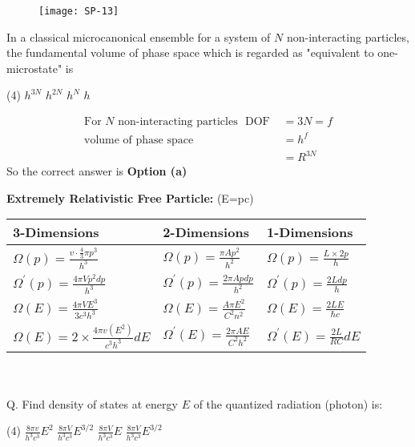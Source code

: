 \begin{figure}[H]
	\texttt{[image: SP-13]}
\end{figure}
\begin{exercise}
	In a classical microcanonical ensemble for a system of $N$ non-interacting particles, the fundamental volume of phase space which is regarded as "equivalent to one-microstate" is 
\end{exercise}
 \begin{tasks}(4)
	\task[\textbf{a.}] $h^{3 N}$
	\task[\textbf{b.}]$h^{2 N}$
	\task[\textbf{c.}]$h^{N}$
	\task[\textbf{d.}]$h$
\end{tasks}
\begin{answer}
	\begin{align*}
	\text{For $N$ non-interacting particles }\text { DOF }&=3 N=f\\
	\text{volume of phase space }&=h^{f}\\
	&=R^{3 N}
	\end{align*}
	So the correct answer is \textbf{Option (a)}
\end{answer}
\textbf{Extremely Relativistic Free Particle: }(E=pc)\\
\renewcommand*{\arraystretch}{1.8}
\begin{tabular}{|p{4cm}|p{4cm}|p{4cm}|}
	\hline
	3-Dimensions & 2-Dimensions & 1-Dimensions\\\hline
	$\Omega(p)=\frac{v \cdot \frac{4}{3} \pi p^{3}}{h^{3}}$&$\Omega(p)=\frac{\pi A p^{2}}{h^{2}}$&$\Omega(p)=\frac{L \times 2 p}{h}$\\
	$\Omega^{\prime}(p)=\frac{4 \pi V p^{2} d p}{h^{3}}$&$\Omega^{\prime}(p)=\frac{2 \pi A p d p}{h^{2}}$&$\Omega^{\prime}(p)=\frac{2 L d p}{h}$\\\hline
	$\Omega(E)=\frac{4 \pi V E^{3}}{3 c^{3} h^{3}}$&$\Omega(E)=\frac{A \pi E^{2}}{C^{2} n^{2}}$&$\Omega(E)=\frac{2 L E}{\hbar c}$\\
	$\Omega(E)=2 \times \frac{4 \pi v\left(E^{2}\right)}{c^{3} h^{3}} d E$&$\Omega^{\prime}(E)=\frac{2 \pi A E}{C^{2} h^{2}}$&$\Omega^{\prime}(E)=\frac{2 L}{R C} d E$\\\hline
\end{tabular}\\\\
Q. Find density of states at energy $E$ of the quantized radiation (photon) is:
 \begin{tasks}(4)
	\task[\textbf{a.}]$\frac{8 \pi v}{h^{3} c^{3}} E^{2}$
	\task[\textbf{b.}]$\frac{8 \pi V}{h^{3} c^{3}} E^{3 / 2}$
	\task[\textbf{c.}]$\frac{8 \pi V}{h^{3} c^{3}} E$
	\task[\textbf{d.}] $\frac{8 \pi V}{h^{3} c^{3}} E^{3 / 2}$
\end{tasks}
